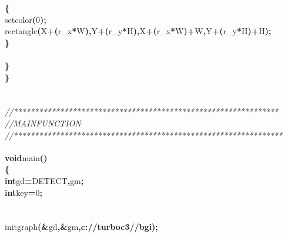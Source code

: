 \documentclass[a4paper, 10pt]{article}
\newcommand\SPC{\hspace*{0.6em}}
\newcommand\QOT{\mbox{\char 34}}
\newcommand{\CppAComment}[1]{\textit{\textcolor[rgb]{0.2,0.6,1}{#1}}}
\newcommand{\CppAIdentifier}[1]{#1}
\newcommand{\CppANumber}[1]{\textcolor[rgb]{0.5,0,0.5}{#1}}
\newcommand{\CppAReservedWord}[1]{\textbf{#1}}
\newcommand{\CppASpace}[1]{\colorbox[rgb]{1,1,1}{#1}}
\newcommand{\CppAString}[1]{\textbf{\textcolor[rgb]{0,0,1}{#1}}}
\newcommand{\CppASymbol}[1]{\textbf{\textcolor[rgb]{1,0,0}{#1}}}
\begin{document}
\begin{ttfamily}
\CppASpace{\SPC \SPC \SPC }\CppASymbol{\{}\\
\CppASpace{\SPC \SPC \SPC \SPC }\CppAIdentifier{setcolor}\CppASymbol{(}\CppANumber{0}\CppASymbol{)}\CppASymbol{;}\\
\CppASpace{\SPC \SPC \SPC \SPC }\CppAIdentifier{rectangle}\CppASymbol{(}\CppAIdentifier{X}\CppASymbol{+}\CppASymbol{(}\CppAIdentifier{r\_x}\CppASymbol{*}\CppAIdentifier{W}\CppASymbol{)}\CppASymbol{,}\CppAIdentifier{Y}\CppASymbol{+}\CppASymbol{(}\CppAIdentifier{r\_y}\CppASymbol{*}\CppAIdentifier{H}\CppASymbol{)}\CppASymbol{,}\CppAIdentifier{X}\CppASymbol{+}\CppASymbol{(}\CppAIdentifier{r\_x}\CppASymbol{*}\CppAIdentifier{W}\CppASymbol{)}\CppASymbol{+}\CppAIdentifier{W}\CppASymbol{,}\CppAIdentifier{Y}\CppASymbol{+}\CppASymbol{(}\CppAIdentifier{r\_y}\CppASymbol{*}\CppAIdentifier{H}\CppASymbol{)}\CppASymbol{+}\CppAIdentifier{H}\CppASymbol{)}\CppASymbol{;}\\
\CppASpace{\SPC \SPC \SPC }\CppASymbol{\}}\\
\\
\CppASpace{\SPC \SPC }\CppASymbol{\}}\\
\CppASymbol{\}}\\
\\
\\
\CppAComment{//***************************************************************}\\
\CppAComment{//\SPC \SPC \SPC MAIN\SPC FUNCTION}\\
\CppAComment{//****************************************************************}\\
\\
\CppAReservedWord{void}\CppASpace{\SPC }\CppAIdentifier{main}\CppASymbol{(}\CppASymbol{)}\\
\CppASymbol{\{}\\
\CppASpace{\SPC }\CppAReservedWord{int}\CppASpace{\SPC }\CppAIdentifier{gd}\CppASymbol{=}\CppAIdentifier{DETECT}\CppASymbol{,}\CppAIdentifier{gm}\CppASymbol{;}\\
\CppASpace{\SPC }\CppAReservedWord{int}\CppASpace{\SPC }\CppAIdentifier{key}\CppASymbol{=}\CppANumber{0}\CppASymbol{;}\\
\\
\\
\CppASpace{\SPC }\CppAIdentifier{initgraph}\CppASymbol{(}\CppASymbol{\&}\CppAIdentifier{gd}\CppASymbol{,}\CppASymbol{\&}\CppAIdentifier{gm}\CppASymbol{,}\CppAString{\QOT c://turboc3//bgi\QOT }\CppASymbol{)}\CppASymbol{;}\\
\\

\end{ttfamily}
\end{document}
